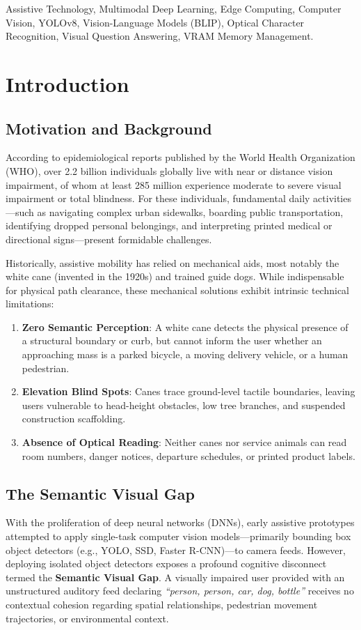\documentclass[conference]{IEEEtran}
\begin{document}
\begin{IEEEkeywords}
Assistive Technology, Multimodal Deep Learning, Edge Computing, Computer Vision, YOLOv8, Vision-Language Models (BLIP), Optical Character Recognition, Visual Question Answering, VRAM Memory Management.
\end{IEEEkeywords}

\section{Introduction}

\subsection{Motivation and Background}
According to epidemiological reports published by the World Health Organization (WHO), over 2.2 billion individuals globally live with near or distance vision impairment, of whom at least 285 million experience moderate to severe visual impairment or total blindness. For these individuals, fundamental daily activities---such as navigating complex urban sidewalks, boarding public transportation, identifying dropped personal belongings, and interpreting printed medical or directional signs---present formidable challenges.

Historically, assistive mobility has relied on mechanical aids, most notably the white cane (invented in the 1920s) and trained guide dogs. While indispensable for physical path clearance, these mechanical solutions exhibit intrinsic technical limitations:
\begin{enumerate}
    \item \textbf{Zero Semantic Perception}: A white cane detects the physical presence of a structural boundary or curb, but cannot inform the user whether an approaching mass is a parked bicycle, a moving delivery vehicle, or a human pedestrian.
    \item \textbf{Elevation Blind Spots}: Canes trace ground-level tactile boundaries, leaving users vulnerable to head-height obstacles, low tree branches, and suspended construction scaffolding.
    \item \textbf{Absence of Optical Reading}: Neither canes nor service animals can read room numbers, danger notices, departure schedules, or printed product labels.
\end{enumerate}

\subsection{The Semantic Visual Gap}
With the proliferation of deep neural networks (DNNs), early assistive prototypes attempted to apply single-task computer vision models---primarily bounding box object detectors (e.g., YOLO, SSD, Faster R-CNN)---to camera feeds. However, deploying isolated object detectors exposes a profound cognitive disconnect termed the \textbf{Semantic Visual Gap}. A visually impaired user provided with an unstructured auditory feed declaring \textit{``person, person, car, dog, bottle''} receives no contextual cohesion regarding spatial relationships, pedestrian movement trajectories, or environmental context.
\end{document}
